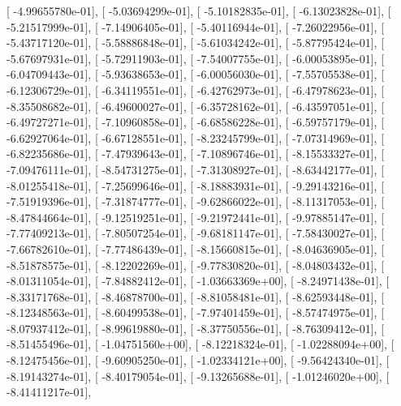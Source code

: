 \documentclass{article}
\begin{document}
       [ -4.99655780e-01],
       [ -5.03694299e-01],
       [ -5.10182835e-01],
       [ -6.13023828e-01],
       [ -5.21517999e-01],
       [ -7.14906405e-01],
       [ -5.40116944e-01],
       [ -7.26022956e-01],
       [ -5.43717120e-01],
       [ -5.58886848e-01],
       [ -5.61034242e-01],
       [ -5.87795424e-01],
       [ -5.67697931e-01],
       [ -5.72911903e-01],
       [ -7.54007755e-01],
       [ -6.00053895e-01],
       [ -6.04709443e-01],
       [ -5.93638653e-01],
       [ -6.00056030e-01],
       [ -7.55705538e-01],
       [ -6.12306729e-01],
       [ -6.34119551e-01],
       [ -6.42762973e-01],
       [ -6.47978623e-01],
       [ -8.35508682e-01],
       [ -6.49600027e-01],
       [ -6.35728162e-01],
       [ -6.43597051e-01],
       [ -6.49727271e-01],
       [ -7.10960858e-01],
       [ -6.68586228e-01],
       [ -6.59757179e-01],
       [ -6.62927064e-01],
       [ -6.67128551e-01],
       [ -8.23245799e-01],
       [ -7.07314969e-01],
       [ -6.82235686e-01],
       [ -7.47939643e-01],
       [ -7.10896746e-01],
       [ -8.15533327e-01],
       [ -7.09476111e-01],
       [ -8.54731275e-01],
       [ -7.31308927e-01],
       [ -8.63442177e-01],
       [ -8.01255418e-01],
       [ -7.25699646e-01],
       [ -8.18883931e-01],
       [ -9.29143216e-01],
       [ -7.51919396e-01],
       [ -7.31874777e-01],
       [ -9.62866022e-01],
       [ -8.11317053e-01],
       [ -8.47844664e-01],
       [ -9.12519251e-01],
       [ -9.21972441e-01],
       [ -9.97885147e-01],
       [ -7.77409213e-01],
       [ -7.80507254e-01],
       [ -9.68181147e-01],
       [ -7.58430027e-01],
       [ -7.66782610e-01],
       [ -7.77486439e-01],
       [ -8.15660815e-01],
       [ -8.04636905e-01],
       [ -8.51878575e-01],
       [ -8.12202269e-01],
       [ -9.77830820e-01],
       [ -8.04803432e-01],
       [ -8.01311054e-01],
       [ -7.84882412e-01],
       [ -1.03663369e+00],
       [ -8.24971438e-01],
       [ -8.33171768e-01],
       [ -8.46878700e-01],
       [ -8.81058481e-01],
       [ -8.62593448e-01],
       [ -8.12348563e-01],
       [ -8.60499538e-01],
       [ -7.97401459e-01],
       [ -8.57474975e-01],
       [ -8.07937412e-01],
       [ -8.99619880e-01],
       [ -8.37750556e-01],
       [ -8.76309412e-01],
       [ -8.51455496e-01],
       [ -1.04751560e+00],
       [ -8.12218324e-01],
       [ -1.02288094e+00],
       [ -8.12475456e-01],
       [ -9.60905250e-01],
       [ -1.02334121e+00],
       [ -9.56424340e-01],
       [ -8.19143274e-01],
       [ -8.40179054e-01],
       [ -9.13265688e-01],
       [ -1.01246020e+00],
       [ -8.41411217e-01],
\end{document}
